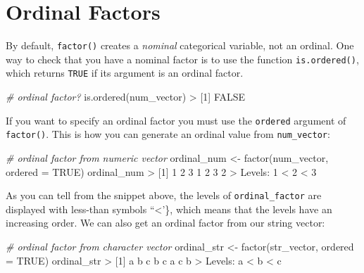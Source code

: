 \documentclass[
]{book}
\newenvironment{Shaded}{\begin{snugshade}}{\end{snugshade}}
\newcommand{\AttributeTok}[1]{\textcolor[rgb]{0.77,0.63,0.00}{#1}}
\newcommand{\CommentTok}[1]{\textcolor[rgb]{0.56,0.35,0.01}{\textit{#1}}}
\newcommand{\ConstantTok}[1]{\textcolor[rgb]{0.00,0.00,0.00}{#1}}
\newcommand{\DecValTok}[1]{\textcolor[rgb]{0.00,0.00,0.81}{#1}}
\newcommand{\FunctionTok}[1]{\textcolor[rgb]{0.00,0.00,0.00}{#1}}
\newcommand{\NormalTok}[1]{#1}
\newcommand{\OtherTok}[1]{\textcolor[rgb]{0.56,0.35,0.01}{#1}}
\newcommand{\SpecialCharTok}[1]{\textcolor[rgb]{0.00,0.00,0.00}{#1}}
\begin{document}
\hypertarget{ordinal-factors}{%
\section{Ordinal Factors}\label{ordinal-factors}}

By default, \texttt{factor()} creates a \emph{nominal} categorical variable, not an ordinal.
One way to check that you have a nominal factor is to use the function
\texttt{is.ordered()}, which returns \texttt{TRUE} if its argument is an ordinal factor.

\begin{Shaded}
\begin{Highlighting}[]
\CommentTok{\# ordinal factor?}
\FunctionTok{is.ordered}\NormalTok{(num\_vector)}
\SpecialCharTok{\textgreater{}}\NormalTok{ [}\DecValTok{1}\NormalTok{] }\ConstantTok{FALSE}
\end{Highlighting}
\end{Shaded}

If you want to specify an ordinal factor you must use the \texttt{ordered} argument of
\texttt{factor()}. This is how you can generate an ordinal value from \texttt{num\_vector}:

\begin{Shaded}
\begin{Highlighting}[]
\CommentTok{\# ordinal factor from numeric vector}
\NormalTok{ordinal\_num }\OtherTok{\textless{}{-}} \FunctionTok{factor}\NormalTok{(num\_vector, }\AttributeTok{ordered =} \ConstantTok{TRUE}\NormalTok{)}
\NormalTok{ordinal\_num}
\SpecialCharTok{\textgreater{}}\NormalTok{ [}\DecValTok{1}\NormalTok{] }\DecValTok{1} \DecValTok{2} \DecValTok{3} \DecValTok{1} \DecValTok{2} \DecValTok{3} \DecValTok{2}
\SpecialCharTok{\textgreater{}}\NormalTok{ Levels}\SpecialCharTok{:} \DecValTok{1} \SpecialCharTok{\textless{}} \DecValTok{2} \SpecialCharTok{\textless{}} \DecValTok{3}
\end{Highlighting}
\end{Shaded}

As you can tell from the snippet above, the levels of \texttt{ordinal\_factor} are
displayed with less-than symbols ``\textless{}'\}, which means that the levels have an
increasing order. We can also get an ordinal factor from our string vector:

\begin{Shaded}
\begin{Highlighting}[]
\CommentTok{\# ordinal factor from character vector}
\NormalTok{ordinal\_str }\OtherTok{\textless{}{-}} \FunctionTok{factor}\NormalTok{(str\_vector, }\AttributeTok{ordered =} \ConstantTok{TRUE}\NormalTok{)}
\NormalTok{ordinal\_str}
\SpecialCharTok{\textgreater{}}\NormalTok{ [}\DecValTok{1}\NormalTok{] a b c b c a c b}
\SpecialCharTok{\textgreater{}}\NormalTok{ Levels}\SpecialCharTok{:}\NormalTok{ a }\SpecialCharTok{\textless{}}\NormalTok{ b }\SpecialCharTok{\textless{}}\NormalTok{ c}
\end{Highlighting}
\end{Shaded}
\end{document}
